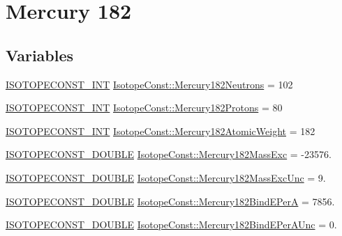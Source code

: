 \hypertarget{group___isotope_const-_mercury-_hg182}{}\section{Mercury 182}
\label{group___isotope_const-_mercury-_hg182}
\subsection*{Variables}
\begin{DoxyCompactItemize}
\item 
\mbox{\hyperlink{group___isotope_const-_macros_ga5f18360b3e99483a35c32d789e62621c}{I\+S\+O\+T\+O\+P\+E\+C\+O\+N\+S\+T\+\_\+\+I\+NT}} \mbox{\hyperlink{group___isotope_const-_mercury-_hg182_ga2e472fd77f28577167ff1a4c5dcf7130}{Isotope\+Const\+::\+Mercury182\+Neutrons}} = 102
\item 
\mbox{\hyperlink{group___isotope_const-_macros_ga5f18360b3e99483a35c32d789e62621c}{I\+S\+O\+T\+O\+P\+E\+C\+O\+N\+S\+T\+\_\+\+I\+NT}} \mbox{\hyperlink{group___isotope_const-_mercury-_hg182_gad366a706d861b832f5364797f5ebd610}{Isotope\+Const\+::\+Mercury182\+Protons}} = 80
\item 
\mbox{\hyperlink{group___isotope_const-_macros_ga5f18360b3e99483a35c32d789e62621c}{I\+S\+O\+T\+O\+P\+E\+C\+O\+N\+S\+T\+\_\+\+I\+NT}} \mbox{\hyperlink{group___isotope_const-_mercury-_hg182_gaeb07128796cdf58edf21590749c646d0}{Isotope\+Const\+::\+Mercury182\+Atomic\+Weight}} = 182
\item 
\mbox{\hyperlink{group___isotope_const-_macros_ga8f45a7272ce02c0b4c65c44636ed719a}{I\+S\+O\+T\+O\+P\+E\+C\+O\+N\+S\+T\+\_\+\+D\+O\+U\+B\+LE}} \mbox{\hyperlink{group___isotope_const-_mercury-_hg182_ga8d7a1687fe1415907b9775d2ef145bfc}{Isotope\+Const\+::\+Mercury182\+Mass\+Exc}} = -\/23576.
\item 
\mbox{\hyperlink{group___isotope_const-_macros_ga8f45a7272ce02c0b4c65c44636ed719a}{I\+S\+O\+T\+O\+P\+E\+C\+O\+N\+S\+T\+\_\+\+D\+O\+U\+B\+LE}} \mbox{\hyperlink{group___isotope_const-_mercury-_hg182_ga411f01a28b806b0d4286ae6e54490946}{Isotope\+Const\+::\+Mercury182\+Mass\+Exc\+Unc}} = 9.
\item 
\mbox{\hyperlink{group___isotope_const-_macros_ga8f45a7272ce02c0b4c65c44636ed719a}{I\+S\+O\+T\+O\+P\+E\+C\+O\+N\+S\+T\+\_\+\+D\+O\+U\+B\+LE}} \mbox{\hyperlink{group___isotope_const-_mercury-_hg182_gab57e8141c6fdf7bc332462daa71e8abd}{Isotope\+Const\+::\+Mercury182\+Bind\+E\+PerA}} = 7856.
\item 
\mbox{\hyperlink{group___isotope_const-_macros_ga8f45a7272ce02c0b4c65c44636ed719a}{I\+S\+O\+T\+O\+P\+E\+C\+O\+N\+S\+T\+\_\+\+D\+O\+U\+B\+LE}} \mbox{\hyperlink{group___isotope_const-_mercury-_hg182_ga36c3668cac10907ba8218a86cbf4a34f}{Isotope\+Const\+::\+Mercury182\+Bind\+E\+Per\+A\+Unc}} = 0.

\end{DoxyCompactItemize}
